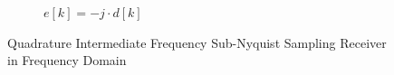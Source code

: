 \begin{figure}[p]
\begin{subfigure}{0.45\textwidth}
    \caption{$e[k] = -j \cdot d[k]$}
    \label{fig:rx_2_freq_e}
  \end{subfigure}
  \caption{Quadrature Intermediate Frequency Sub-Nyquist Sampling Receiver
    in Frequency Domain}
  \label{fig:rx_2_freq}
\end{figure}

